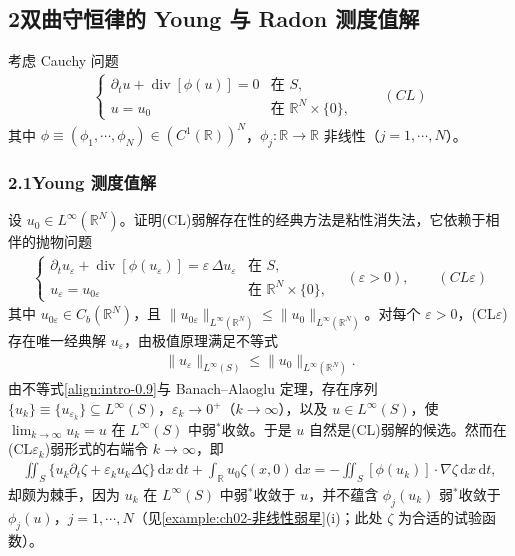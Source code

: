 \documentclass[../main.tex]{subfiles}
\begin{document}
\subsection*{2\quad 双曲守恒律的 Young 与 Radon 测度值解}\label{subsection:intro-hyperbolic}

考虑 Cauchy 问题
\begin{align*}
\begin{cases}
\partial_t u + \operatorname{div}[\phi(u)] = 0 & \text{在 }S,\\
u=u_0 & \text{在 }\mathbb{R}^N\times\{0\},
\end{cases}
\qquad(CL)
\end{align*}
其中 $\phi\equiv(\phi_1,\cdots ,\phi_N)\in(C^1(\mathbb{R}))^N$，$\phi_j:\mathbb{R}\to\mathbb{R}$ 非线性（$j=1,\cdots ,N$）。

\subsubsection*{2.1\quad Young 测度值解}\label{subsubsection:intro-young}

设 $u_0\in L^\infty(\mathbb{R}^N)$。证明(CL)弱解存在性的经典方法是粘性消失法，它依赖于相伴的抛物问题
\begin{align*}
\begin{cases}
\partial_t u_\varepsilon + \operatorname{div}[\phi(u_\varepsilon)] = \varepsilon\,\Delta u_\varepsilon & \text{在 }S,\\
u_\varepsilon = u_{0\varepsilon} & \text{在 }\mathbb{R}^N\times\{0\},
\end{cases}
\quad (\varepsilon>0), \qquad(CL\varepsilon)
\end{align*}
其中 $u_{0\varepsilon}\in C_b(\mathbb{R}^N)$，且 $\|u_{0\varepsilon}\|_{L^\infty(\mathbb{R}^N)}\leqslant\|u_0\|_{L^\infty(\mathbb{R}^N)}$。对每个 $\varepsilon>0$，(CL$\varepsilon$)存在唯一经典解 $u_\varepsilon$，由极值原理满足不等式
\begin{align}
\|u_\varepsilon\|_{L^\infty(S)} \leqslant \|u_0\|_{L^\infty(\mathbb{R}^N)}. \label{align:intro-0.9}
\end{align}
由不等式\eqref{align:intro-0.9}与 Banach--Alaoglu 定理，存在序列 $\{u_k\}\equiv\{u_{\varepsilon_k}\}\subseteq L^\infty(S)$，$\varepsilon_k\to0^+$（$k\to\infty$），以及 $u\in L^\infty(S)$，使 $\lim_{k\to\infty}u_k=u$ 在 $L^\infty(S)$ 中弱$^*$收敛。于是 $u$ 自然是(CL)弱解的候选。然而在(CL$\varepsilon_k$)弱形式的右端令 $k\to\infty$，即
\begin{align}
\iint_S \{u_k\partial_t\zeta + \varepsilon_k u_k\Delta\zeta\}\,\mathrm{d}x\,\mathrm{d}t
+ \int_{\mathbb{R}}u_0\zeta(x,0)\,\mathrm{d}x
= -\iint_S [\phi(u_k)]\cdot\nabla\zeta\,\mathrm{d}x\,\mathrm{d}t, \label{align:intro-0.10}
\end{align}
却颇为棘手，因为 $u_k$ 在 $L^\infty(S)$ 中弱$^*$收敛于 $u$，并不蕴含 $\phi_j(u_k)$ 弱$^*$收敛于 $\phi_j(u)$，$j=1,\cdots ,N$（见\cref{example:ch02-非线性弱星}(i)；此处 $\zeta$ 为合适的试验函数）。
\end{document}
